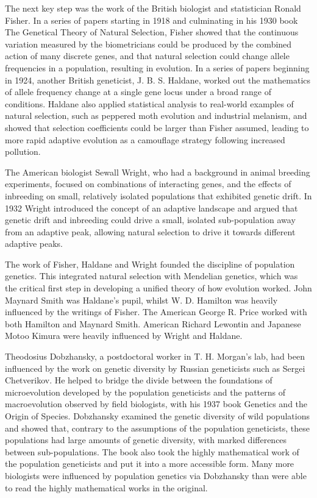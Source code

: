 The next key step was the work of the British biologist and statistician Ronald Fisher. In a series of papers starting in 1918 and culminating in his 1930 book The Genetical Theory of Natural Selection, Fisher showed that the continuous variation measured by the biometricians could be produced by the combined action of many discrete genes, and that natural selection could change allele frequencies in a population, resulting in evolution. In a series of papers beginning in 1924, another British geneticist, J. B. S. Haldane, worked out the mathematics of allele frequency change at a single gene locus under a broad range of conditions. Haldane also applied statistical analysis to real-world examples of natural selection, such as peppered moth evolution and industrial melanism, and showed that selection coefficients could be larger than Fisher assumed, leading to more rapid adaptive evolution as a camouflage strategy following increased pollution.

The American biologist Sewall Wright, who had a background in animal breeding experiments, focused on combinations of interacting genes, and the effects of inbreeding on small, relatively isolated populations that exhibited genetic drift. In 1932 Wright introduced the concept of an adaptive landscape and argued that genetic drift and inbreeding could drive a small, isolated sub-population away from an adaptive peak, allowing natural selection to drive it towards different adaptive peaks.

The work of Fisher, Haldane and Wright founded the discipline of population genetics. This integrated natural selection with Mendelian genetics, which was the critical first step in developing a unified theory of how evolution worked. John Maynard Smith was Haldane's pupil, whilst W. D. Hamilton was heavily influenced by the writings of Fisher. The American George R. Price worked with both Hamilton and Maynard Smith. American Richard Lewontin and Japanese Motoo Kimura were heavily influenced by Wright and Haldane.

Theodosius Dobzhansky, a postdoctoral worker in T. H. Morgan's lab, had been influenced by the work on genetic diversity by Russian geneticists such as Sergei Chetverikov. He helped to bridge the divide between the foundations of microevolution developed by the population geneticists and the patterns of macroevolution observed by field biologists, with his 1937 book Genetics and the Origin of Species. Dobzhansky examined the genetic diversity of wild populations and showed that, contrary to the assumptions of the population geneticists, these populations had large amounts of genetic diversity, with marked differences between sub-populations. The book also took the highly mathematical work of the population geneticists and put it into a more accessible form. Many more biologists were influenced by population genetics via Dobzhansky than were able to read the highly mathematical works in the original.

